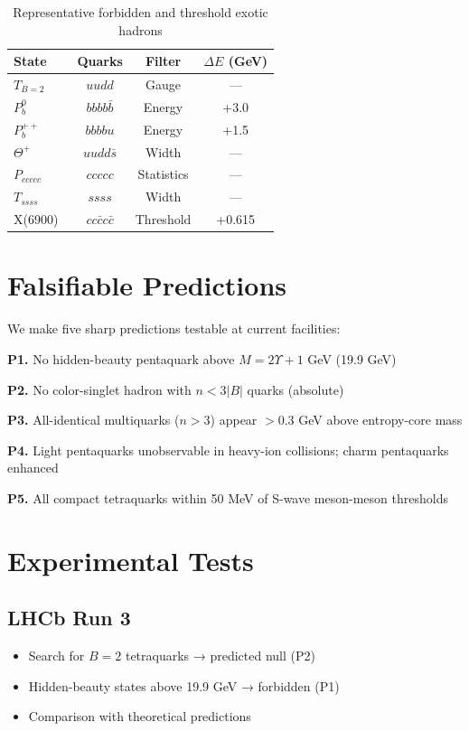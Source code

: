 \documentclass[12pt,a4paper]{article}
\begin{document}
\begin{table}[H]
\centering
\caption{Representative forbidden and threshold exotic hadrons}
\begin{tabular}{lccc}
\toprule
State & Quarks & Filter & $\Delta E$ (GeV) \\
\midrule
$T_{B=2}$ & $uudd$ & Gauge & — \\
$P_b^0$ & $bbbb\bar{b}$ & Energy & +3.0 \\
$P_b^{++}$ & $bbbbu$ & Energy & +1.5 \\
$\Theta^+$ & $uudd\bar{s}$ & Width & —\\
$P_{ccccc}$ & $ccccc$ & Statistics & — \\
$T_{ssss}$ & $ssss$ & Width & — \\
\midrule
X(6900)~\cite{LHCb2020} & $cc\bar{c}c\bar{c}$ & Threshold & +0.615 \\
\bottomrule
\end{tabular}
\label{tab:forbidden}
\end{table}

\section{Falsifiable Predictions}

We make five sharp predictions testable at current facilities:

\textbf{P1.} No hidden-beauty pentaquark above $M = 2\Upsilon + 1$ GeV (19.9 GeV)

\textbf{P2.} No color-singlet hadron with $n < 3|B|$ quarks (absolute)

\textbf{P3.} All-identical multiquarks ($n>3$) appear $>0.3$ GeV above entropy-core mass

\textbf{P4.} Light pentaquarks unobservable in heavy-ion collisions; charm pentaquarks enhanced

\textbf{P5.} All compact tetraquarks within 50 MeV of S-wave meson-meson thresholds

\section{Experimental Tests}

\subsection{LHCb Run 3}

\begin{itemize}
\item Search for $B=2$ tetraquarks → predicted null (P2)
\item Hidden-beauty states above 19.9 GeV → forbidden (P1)
\item Comparison with theoretical predictions~\cite{Karliner2018}
\end{itemize}
\end{document}
